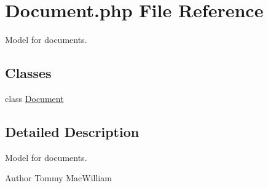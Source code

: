 \hypertarget{Document_8php}{
\section{\-Document.php \-File \-Reference}
\label{Document_8php}
}


\-Model for documents.  


\subsection*{\-Classes}
\begin{DoxyCompactItemize}
\item 
class \hyperlink{classDocument}{\-Document}
\end{DoxyCompactItemize}


\subsection{\-Detailed \-Description}
\-Model for documents. \begin{DoxyAuthor}{\-Author}
\-Tommy \-Mac\-William 
\end{DoxyAuthor}
